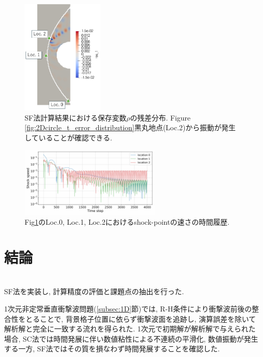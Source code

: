 \documentclass[a4j]{jarticle}
\begin{document}
\begin{figure}[h]
    \begin{center}
        \includegraphics[width=0.35\textwidth]{2Dcirc_res_1.pdf}
    \end{center}
    \caption{SF法計算結果における保存変数$\rho$の残差分布.
    Figure \ref{fig:2Dcircle_t_error_distribution}黒丸地点(Loc.2)から振動が発生していることが確認できる.}
    \label{fig:2Dcircle_res1_distribution}
\end{figure}
\begin{figure}[H]
    \begin{center}
    \hspace*{-15mm} %
        \includegraphics[width=0.6\textwidth]{2Dcirc_shock_speed_conv.pdf}
    \end{center}
    \caption{Fig\ref{fig:2Dcircle_res1_distribution}のLoc.0, Loc.1, Loc.2におけるshock-pointの速さの時間履歴.}
    \label{fig:2Dcircle_speed_conv}
\end{figure}

\clearpage
\section{結論} \label{sec:conclusion}
\mbox{}\\[-3.0ex]

SF法を実装し, 計算精度の評価と課題点の抽出を行った.

1次元非定常垂直衝撃波問題(\ref{subsec:1D}節)では, R-H条件により衝撃波前後の整合性をとることで,
背景格子位置に依らず衝撃波面を追跡し, 演算誤差を除いて解析解と完全に一致する流れを得られた.
1次元で初期解が解析解で与えられた場合, SC法では時間発展に伴い数値粘性による不連続の平滑化, 数値振動が発生する一方, 
SF法ではその質を損なわず時間発展することを確認した.
\end{document}

